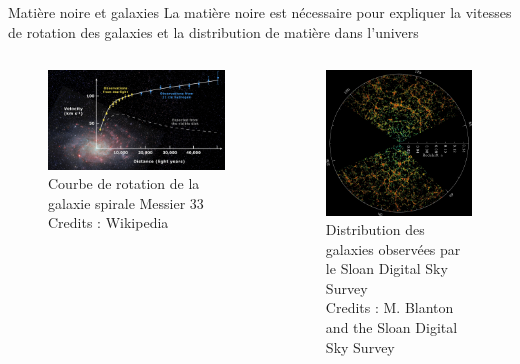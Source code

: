 \documentclass{beamer}
\newcommand{\credits}[1]{\tiny Credits : #1}
\begin{document}
\begin{frame}{Matière noire et galaxies}
	La matière noire est nécessaire pour expliquer la vitesses de rotation des galaxies et la distribution de matière dans l'univers
\begin{columns}
\begin{column}{0.5\textwidth}
	\begin{figure}
		\centering
		\includegraphics[width=.9\textwidth]{figures/Rotation_curve_galaxy.png}
		\caption{Courbe de rotation de la galaxie spirale Messier 33 \\ \credits{Wikipedia}}
	\end{figure}
\end{column}
\begin{column}{0.5\textwidth}
	\begin{figure}
		\centering
		\includegraphics[width=.8\textwidth]{figures/sdss_pie2.jpg}
		\caption{Distribution des galaxies observées par le Sloan Digital Sky Survey \\ \credits{M. Blanton and the Sloan Digital Sky Survey}}
	\end{figure}
\end{column}
\end{columns}
\end{frame}
\end{document}

